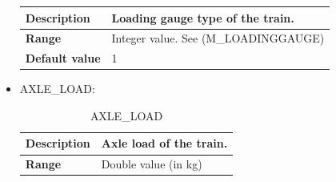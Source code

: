 \documentclass{template/openetcs}
\begin{document}
\begin{itemize}
\begin{longtable}{|l|l|}
					\begin{minipage}[t]{0.22\linewidth} \textbf{Description}	\end{minipage} 
				&	\begin{minipage}[t]{0.78\linewidth} Loading gauge type of the train. \end{minipage} \\
				
				\hline
																																									
					\begin{minipage}[t]{0.22\linewidth} \textbf{Range}	\end{minipage} 
				&	\begin{minipage}[t]{0.78\linewidth} Integer value. See (M\_LOADINGGAUGE) \end{minipage} \\
				
				\hline
				
					\begin{minipage}[t]{0.22\linewidth} \textbf{Default value}	\end{minipage} 
				&	\begin{minipage}[t]{0.78\linewidth} 1 \end{minipage} \\
				
				\hline
				
			\end{longtable}
			
		\item AXLE\_LOAD:
																															
			\begin{longtable}{|l|l|}
				\caption{AXLE\_LOAD}\\ 
				\hline
				
					\begin{minipage}[t]{0.22\linewidth} \textbf{Description}	\end{minipage} 
				&	\begin{minipage}[t]{0.78\linewidth} Axle load of the train. \end{minipage} \\
				
				\hline
																																									
					\begin{minipage}[t]{0.22\linewidth} \textbf{Range}	\end{minipage} 
				&	\begin{minipage}[t]{0.78\linewidth} Double value (in kg) \end{minipage} \\
				

\end{longtable}
\end{itemize}
\end{document}
